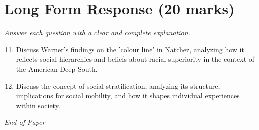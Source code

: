 \documentclass[12pt]{article}
\begin{document}
\section*{Long Form Response (20 marks)}
\textit{Answer each question with a clear and complete explanation.}
\begin{enumerate}[label=\arabic*.]
\setcounter{enumi}{10}
\item Discuss Warner's findings on the 'colour line' in Natchez, analyzing how it reflects social hierarchies and beliefs about racial superiority in the context of the American Deep South.
\item Discuss the concept of social stratification, analyzing its structure, implications for social mobility, and how it shapes individual experiences within society.
\end{enumerate}

\vfill
\noindent\textit{End of Paper}
\end{document}
